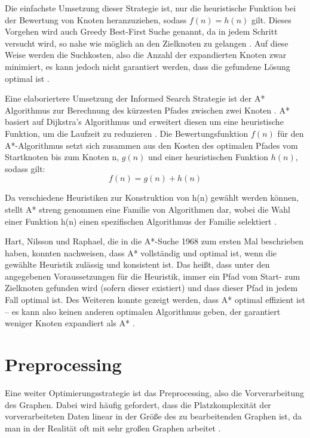 Die einfachste Umsetzung dieser Strategie ist, nur die heuristische Funktion bei der Bewertung von Knoten heranzuziehen, sodass $f(n)=h(n)$ gilt. Dieses Vorgehen wird auch Greedy Best-First Suche genannt, da in jedem Schritt versucht wird, so nahe wie möglich an den Zielknoten zu gelangen \cite{Russel2010}. Auf diese Weise werden die Suchkosten, also die Anzahl der expandierten Knoten zwar minimiert, es kann jedoch nicht garantiert werden, dass die gefundene Lösung optimal ist \cite{Heusner2017}.

Eine elaboriertere Umsetzung der Informed Search Strategie ist der A* Algorithmus zur Berechnung des kürzesten Pfades zwischen zwei Knoten \cite{Russel2010}. A* basiert auf Dijkstra’s Algorithmus und erweitert diesen um eine heuristische Funktion, um die Laufzeit zu reduzieren \cite{Peralta2020}. Die Bewertungsfunktion $f(n)$ für den A*-Algorithmus setzt sich zusammen aus den Kosten des optimalen Pfades vom Startknoten bis zum Knoten n, $g(n)$ und einer heuristischen Funktion $h(n)$, sodass gilt:
\begin{equation} \label{eq:3.1}
	f(n)=g(n)+h(n)
\end{equation}

Da verschiedene Heuristiken zur Konstruktion von h(n) gewählt werden können, stellt A* streng genommen eine Familie von Algorithmen dar, wobei die Wahl einer Funktion h(n) einen spezifischen Algorithmus der Familie selektiert \cite{Hart1968}. 

Hart, Nilsson und Raphael, die in \cite{Hart1968} die A*-Suche 1968 zum ersten Mal beschrieben haben, konnten nachweisen, dass A* vollständig und optimal ist, wenn die gewählte Heuristik zulässig und konsistent ist. Das heißt, dass unter den angegebenen Voraussetzungen für die Heuristik, immer ein Pfad vom Start- zum Zielknoten gefunden wird (sofern dieser existiert) und dass dieser Pfad in jedem Fall optimal ist. Des Weiteren konnte gezeigt werden, dass A* optimal effizient ist – es kann also keinen anderen optimalen Algorithmus geben, der garantiert weniger Knoten expandiert als A* \cite{Russel2010}.

\section{Preprocessing}
Eine weiter Optimierungsstrategie ist das Preprocessing, also die Vorverarbeitung des Graphen. Dabei wird häufig gefordert, dass die Platzkomplexität der vorverarbeiteten Daten linear in der Größe des zu bearbeitenden Graphen ist, da man in der Realität oft mit sehr großen Graphen arbeitet \cite{Goldberg2005}. 

